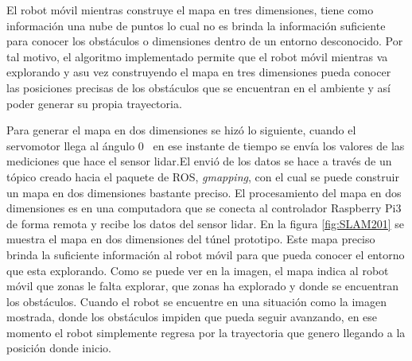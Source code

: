 El robot móvil mientras construye el mapa en tres dimensiones, tiene como información una nube 
de puntos lo cual no es brinda la información suficiente para conocer los obstáculos o 
dimensiones dentro de un entorno desconocido. Por tal motivo, el algoritmo implementado permite 
que el robot móvil mientras va explorando y asu vez construyendo el mapa en tres dimensiones 
pueda conocer las posiciones precisas de los obstáculos que se encuentran en el ambiente y así 
poder generar su propia trayectoria.

Para generar el mapa en dos dimensiones se hizó lo siguiente, cuando el servomotor llega al ángulo
0\grad~ en ese instante de tiempo se envía los valores de las mediciones que hace el sensor lidar.El
envió de los datos se hace a través de un tópico creado hacia el paquete de ROS, \textit{gmapping}, 
con el cual se puede construir un mapa en dos dimensiones bastante preciso. El procesamiento del 
mapa en dos dimensiones es en una computadora que se conecta al controlador Raspberry Pi3 de forma 
remota y recibe los datos del sensor lidar. En la figura \ref{fig:SLAM201} se muestra el mapa en 
dos dimensiones del túnel prototipo. Este mapa preciso brinda la suficiente información al robot  
móvil para que pueda conocer el entorno que esta explorando. Como se puede ver en la imagen, el 
mapa indica al robot móvil que zonas le falta explorar, que zonas ha explorado y donde se 
encuentran los obstáculos. Cuando el robot se encuentre en una situación como la imagen mostrada, 
donde los obstáculos impiden que pueda seguir avanzando, en ese momento el robot simplemente regresa 
por la trayectoria que genero llegando a la posición donde inicio.
 
